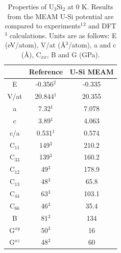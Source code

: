 \documentclass[review]{elsarticle}
\begin{document}
\begin{table}[h!]
\caption{Properties of U$_{3}$Si$_{2}$ at 0 K.  Results from the MEAM U-Si potential are compared to experiments$^{1}$\cite{zachariasen1949}$^{2}$\cite{berche2009} and DFT$^{3}$\cite{noordhoek2016} calculations.  Units are as follows: E (eV/atom), V/at (\AA$^{3}$/atom), a and c (\AA), C$_{xx}$, B and G (GPa). }\label{tab:ben5}
\begin{center}
\begin{tabular}{|c|c|c|}
     \hline
      & Reference & U-Si MEAM  \\
     \hline
     E & -0.356$^{2}$ & -0.335 \\
     V/at & 20.844$^{1}$ & 20.355 \\
     a & 7.32$^{1}$ & 7.078 \\
     c & 3.89$^{1}$ & 4.063 \\
     c/a & 0.531$^{1}$ & 0.574 \\
     C$_{11}$ & 149$^{3}$ & 210.2  \\
     C$_{33}$ & 139$^{3}$ & 160.2 \\
     C$_{12}$ & 49$^{3}$ & 178.9 \\
     C$_{13}$ & 48$^{3}$ & 65.8 \\
     C$_{44}$ & 63$^{3}$ & 103.1 \\
     C$_{66}$ & 46$^{3}$ & 35.4 \\
     B & 81$^{3}$ & 134 \\
     G$^{xy}$ & 50$^{3}$ & 16  \\
     G$^{xz}$ & 48$^{3}$ & 60 \\
     \hline
\end{tabular}
\end{center}
\label{default}
\end{table}%

\FloatBarrier
\end{document}
